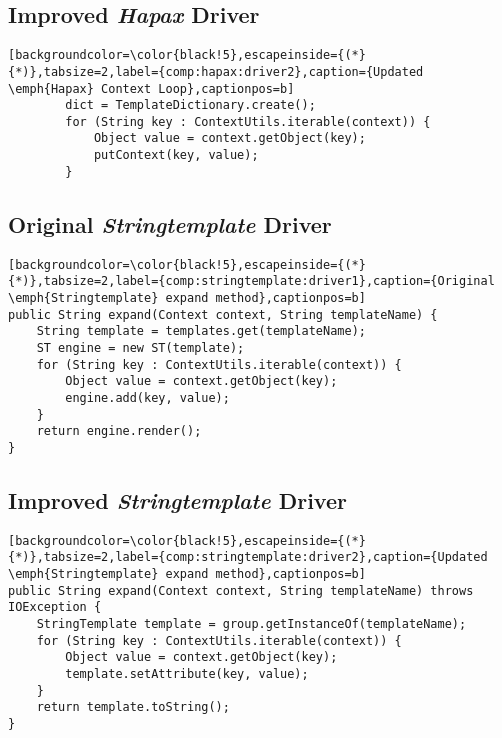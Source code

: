 \subsection*{Improved \emph{Hapax} Driver}
\label{appendix:hapax:driver2}

\begin{lstlisting}[backgroundcolor=\color{black!5},escapeinside={(*}{*)},tabsize=2,label={comp:hapax:driver2},caption={Updated \emph{Hapax} Context Loop},captionpos=b]
        dict = TemplateDictionary.create();
        for (String key : ContextUtils.iterable(context)) {
            Object value = context.getObject(key);
            putContext(key, value);
        }
\end{lstlisting}

\subsection*{Original \emph{Stringtemplate} Driver}
\label{appendix:stringtemplate:driver1}

\begin{lstlisting}[backgroundcolor=\color{black!5},escapeinside={(*}{*)},tabsize=2,label={comp:stringtemplate:driver1},caption={Original \emph{Stringtemplate} expand method},captionpos=b]
public String expand(Context context, String templateName) {
    String template = templates.get(templateName);
    ST engine = new ST(template);
    for (String key : ContextUtils.iterable(context)) {
        Object value = context.getObject(key);
        engine.add(key, value);
    }
    return engine.render();
}
\end{lstlisting}

\subsection*{Improved \emph{Stringtemplate} Driver}
\label{appendix:stringtemplate:driver2}

\begin{lstlisting}[backgroundcolor=\color{black!5},escapeinside={(*}{*)},tabsize=2,label={comp:stringtemplate:driver2},caption={Updated \emph{Stringtemplate} expand method},captionpos=b]
public String expand(Context context, String templateName) throws IOException {
    StringTemplate template = group.getInstanceOf(templateName);
    for (String key : ContextUtils.iterable(context)) {
        Object value = context.getObject(key);
        template.setAttribute(key, value);
    }
    return template.toString();
}
\end{lstlisting}
